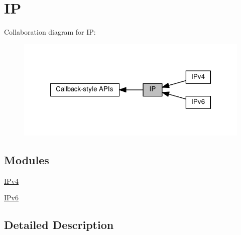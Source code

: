 \hypertarget{group__ip}{}\section{IP}
\label{group__ip}
Collaboration diagram for IP\+:
\nopagebreak
\begin{figure}[H]
\begin{center}
\leavevmode
\includegraphics[width=322pt]{group__ip}
\end{center}
\end{figure}
\subsection*{Modules}
\begin{DoxyCompactItemize}
\item 
\hyperlink{group__ip4}{I\+Pv4}
\item 
\hyperlink{group__ip6}{I\+Pv6}
\end{DoxyCompactItemize}


\subsection{Detailed Description}
